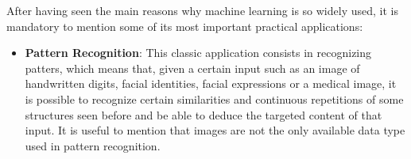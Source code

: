 After having seen the main reasons why machine learning is so widely
used, it is mandatory to mention some of its most important practical
applications:

\begin{itemize}
    \item \textbf{Pattern Recognition}: This classic application
          consists in recognizing patters, which means that, given a
          certain input such as an image of handwritten digits, facial
          identities, facial expressions or a medical image, it is
          possible to recognize certain similarities and continuous
          repetitions of some structures seen before and be able to
          deduce the targeted content of that input. It is useful to
          mention that images are not the only available data type used
          in pattern recognition.
          \vspace{5mm}


\end{itemize}
